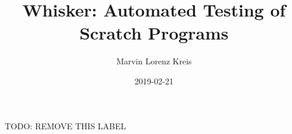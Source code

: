 \documentclass[12pt,a4paper,twoside]{report}
\title{Whisker: Automated Testing of Scratch Programs}
\author{Marvin Lorenz Kreis}
\date{2019-02-21}
\begin{document}



\maketitle


\tableofcontents
\clearpage

\listoffigures





%














\clearpage
%



\appendix


TODO: REMOVE THIS LABEL
\label{TODO}
\end{document}
